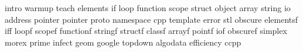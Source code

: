 intro
warmup
teach
elements
if
loop
function
scope
struct
object
array
string
io
address
pointer
pointer
proto
namespace
cpp
template
error
stl
obscure
elementsf
iff
loopf
scopef
functionf
stringf
structf
classf
arrayf
pointf
iof
obscuref
simplex
morex
prime
infect
geom
google
topdown
algodata
efficiency
ccpp
